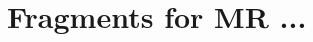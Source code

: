 \documentclass[11pt,oneside,leqno,openright]{report}
\begin{document}
\chapter{Fragments for MR ...}


% 

% 

% 
%
% 

\end{document}
